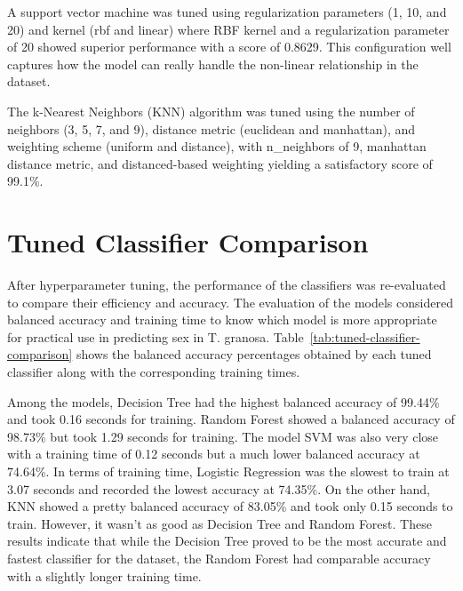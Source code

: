 A support vector machine was tuned using regularization parameters (1, 10, and 20) and kernel (rbf and linear) where RBF kernel and a regularization parameter of 20 showed superior performance with a score of 0.8629. This configuration well captures how the model can really handle the non-linear relationship in the dataset. 

The k-Nearest Neighbors (KNN) algorithm was tuned using the number of neighbors (3, 5, 7, and 9), distance metric (euclidean and manhattan), and weighting scheme (uniform and distance), with n\_neighbors of 9, manhattan distance metric, and distanced-based weighting yielding a satisfactory score of 99.1\%.

\section{Tuned Classifier Comparison}

After hyperparameter tuning, the performance of the classifiers was re-evaluated to compare their efficiency and accuracy. The evaluation of the models considered balanced accuracy and training time to know which model is more appropriate for practical use in predicting sex in T. granosa. Table~\ref{tab:tuned-classifier-comparison} shows the balanced accuracy percentages obtained by each tuned classifier along with the corresponding training times.

\begin{table}[H]
	\centering
	\caption{Balanced accuracy and training time for each machine learning model.}
	\label{tab:tuned-classifier-comparison}
\end{table}

Among the models, Decision Tree had the highest balanced accuracy of 99.44\% and took 0.16 seconds for training. Random Forest showed a balanced accuracy of 98.73\% but took 1.29 seconds for training. The model SVM was also very close with a training time of 0.12 seconds but a much lower balanced accuracy at 74.64\%. In terms of training time, Logistic Regression was the slowest to train at 3.07 seconds and recorded the lowest accuracy at 74.35\%. On the other hand, KNN showed a pretty balanced accuracy of 83.05\% and took only 0.15 seconds to train. However, it wasn't as good as Decision Tree and Random Forest. These results indicate that while the Decision Tree proved to be the most accurate and fastest classifier for the dataset, the Random Forest had comparable accuracy with a slightly longer training time.

